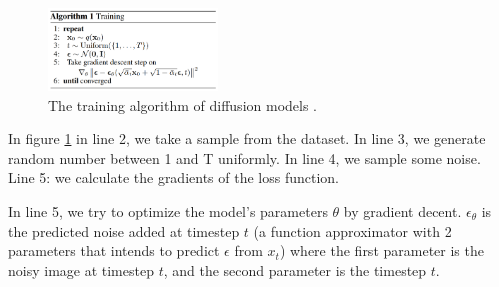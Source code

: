 \begin{figure}
    \centering
    \includegraphics[width=0.4\textwidth]{images/diffusion_models/training.png}
    \caption{The training algorithm of diffusion models \cite{ddpm}.}
    \label{fig:ddpm_training}
\end{figure}

In figure \ref{fig:ddpm_training} in line 2, we take a sample from the dataset. In line 3, we generate random number between 1 and T uniformly. In line 4, we sample some noise. Line 5: we calculate the gradients of the loss function.

In line 5, we try to optimize the model's parameters $\theta$ by gradient decent. $\epsilon_\theta$ is the predicted noise added at timestep $t$ (a function approximator with 2 parameters that intends to predict $\epsilon$ from $x_t$) where the first parameter is the noisy image at timestep $t$, and the second parameter is the timestep $t$.



